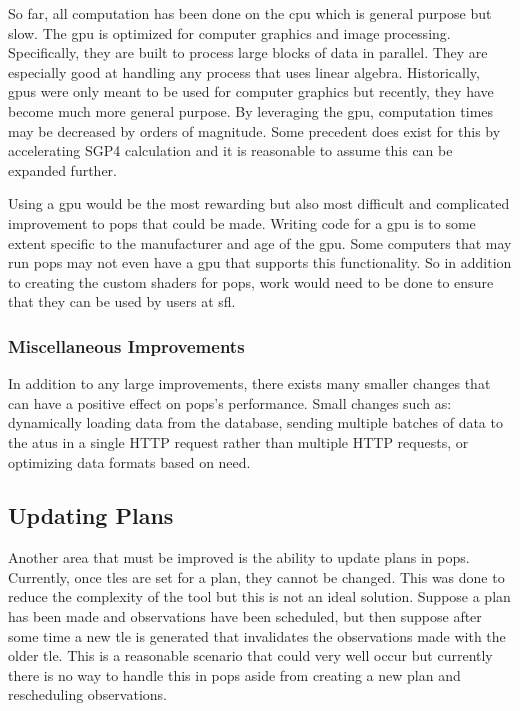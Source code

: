 So far, all computation has been done on the \gls{cpu} which is general purpose
but slow. The \gls{gpu} is optimized for computer graphics and image
processing. Specifically, they are built to process large blocks of data in
parallel. They are especially good at handling any process that uses linear
algebra. Historically, \glspl{gpu} were only meant to be used for computer
graphics but recently, they have become much more general purpose. By
leveraging the \gls{gpu}, computation times may be decreased by orders of
magnitude. Some precedent does exist for this by accelerating SGP4 calculation
\cite{moeckel_high_2016} \cite{fraire_opencl-accelerated_2013} and it is
reasonable to assume this can be expanded further.

Using a \gls{gpu} would be the most rewarding but also most difficult and
complicated improvement to \gls{pops} that could be made. Writing code for a
\gls{gpu} is to some extent specific to the manufacturer and age of the
\gls{gpu}. Some computers that may run \gls{pops} may not even have a \gls{gpu}
that supports this functionality. So in addition to creating the custom shaders
for \gls{pops}, work would need to be done to ensure that they can be used by
users at \gls{sfl}.
 

\subsubsection{Miscellaneous Improvements}

In addition to any large improvements, there exists many smaller changes that
can have a positive effect on \gls{pops}'s performance. Small changes such as:
dynamically loading data from the database, sending multiple batches of data to
the \glspl{atu} in a single HTTP request rather than multiple HTTP requests, or
optimizing data formats based on need.


\subsection{Updating Plans}

Another area that must be improved is the ability to update plans in
\gls{pops}. Currently, once \glspl{tle} are set for a plan, they cannot be
changed. This was done to reduce the complexity of the tool but this is not an
ideal solution.  Suppose a plan has been made and observations have been
scheduled, but then suppose after some time a new \gls{tle} is generated that
invalidates the observations made with the older \gls{tle}. This is a
reasonable scenario that could very well occur but currently there is no way to
handle this in \gls{pops} aside from creating a new plan and rescheduling
observations.

